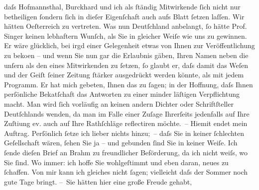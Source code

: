 \begin{ledgroupsized}[t]{13cm}
               daſs Hof{\pb}mannsthal, Burckhard und ich als
               ſtändig Mitwirkende ſich nicht nur betheiligen ſondern ſich in dieſer Eigenſchaft
               auch aufs Blatt ſetzen laſſen. Wir hätten Oeſterreich zu vertreten. Was nun Deutſchland anbelangt, ſo hätte Prof. Singer keinen lebhaftern Wunſch, als Sie {\pb}in gleicher Weiſe wie uns zu gewinnen. Er wäre
               glücklich, bei irgd einer Gelegenheit etwas von Ihnen zur Veröffentlichung zu beko{\geminationm}en – und wenn Sie nun gar die Erlaubnis gäben, Ihren
               Namen neben die unſern als den eines Mitwirkenden zu ſetzen, ſo glaubt er, daſs damit
               das Weſen und der Geiſt ſeiner Zeitung ſtärker {\pb}ausgedrückt werden könnte, als mit jedem Programm. Er hat mich gebeten, Ihnen das
               zu ſagen; in der Hoffnung, daſs Ihnen perſönliche Beka{\geminationn}tſchaft das Antworten zu einer minder läſtigen Verpflichtung macht. Man wird ſich
               vorläufig an keinen andern Dichter oder Schriftſteller Deutſch{\pb}lands wenden, da man im
               Falle einer Zuſage Ihrerſeits jedenfalls auf Ihre Zuſti{\geminationm}ung ev. auch auf Ihre Rathſchläge reflectiren möchte. –\pend
           \pstart
           Hiemit endet mein Auftrag. Perſönlich ſetze ich lieber nichts hinzu; – daſs Sie in
               keiner ſchlechten Geſellschaft wären, ſehen Sie ja – und gebunden ſind {\pb}Sie in keiner Weiſe.\pend
           \pstart
           Ich ſende dieſen Brief an Brahm zu
               freundlicher Beförderung, da ich nicht weiſs, wo Sie ſind. Wo immer: ich hoffe Sie
               wohlgeſtimmt und eben daran, neues zu ſchaffen.\pend
           \pstart
           Von mir kann ich gleiches nicht ſagen; vielleicht daſs der Sommer noch gute Tage bringt.\pend
           \pstart
           {\pb}– Sie hätten hier eine große Freude gehabt,

\end{ledgroupsized}
